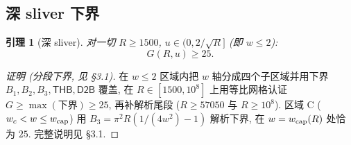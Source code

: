 \documentclass[UTF8]{ctexart}
\newtheorem{lemma}[theorem]{引理}
\begin{document}
\subsection{深 sliver 下界}\label{sec:sliver}
\begin{lemma}[深 sliver]\label{lem:sliver}
对一切 $R\ge1500$, $u\in(0,2/\sqrt R]$ (即 $w\le2$):
\begin{equation}
	G(R,u)\ge25.
\end{equation}
\end{lemma}
\begin{proof}[证明 (分段下界, 见 §3.1)]
在 $w\le2$ 区域内把 $w$ 轴分成四个子区域并用下界 $B_1,B_2,B_3,\mathsf{THB},\mathsf{D2B}$ 覆盖,
在 $R\in[1500,10^8]$ 上用等比网格认证 $G\ge\max(\text{下界})\ge25$,
再补解析尾段 ($R\ge57050$ 与 $R\ge10^8$).
区域 C ($w_c<w\le w_{\rm cap}$) 用 $B_3=\pi^2R(1/(4w^2)-1)$ 解析下界,
在 $w=w_{\rm cap}(R)$ 处恰为 $25$. 完整说明见 §3.1.
\end{proof}
\end{document}
